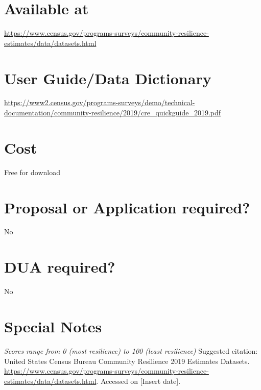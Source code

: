 \documentclass[
]{book}
\begin{document}
\hypertarget{available-at-18}{%
\section{Available at}\label{available-at-18}}

\url{https://www.census.gov/programs-surveys/community-resilience-estimates/data/datasets.html}

\hypertarget{user-guidedata-dictionary-18}{%
\section{User Guide/Data Dictionary}\label{user-guidedata-dictionary-18}}

\url{https://www2.census.gov/programs-surveys/demo/technical-documentation/community-resilience/2019/cre_quickguide_2019.pdf}

\hypertarget{cost-18}{%
\section{Cost}\label{cost-18}}

Free for download

\hypertarget{proposal-or-application-required-18}{%
\section{Proposal or Application required?}\label{proposal-or-application-required-18}}

No

\hypertarget{dua-required-18}{%
\section{DUA required?}\label{dua-required-18}}

No

\hypertarget{special-notes-18}{%
\section{Special Notes}\label{special-notes-18}}

\emph{Scores range from 0 (most resilience) to 100 (least resilience)
} Suggested citation: United States Census Bureau Community Resilience 2019 Estimates Datasets. \url{https://www.census.gov/programs-surveys/community-resilience-estimates/data/datasets.html}. Accessed on {[}Insert date{]}.

\mainmatter
\end{document}

